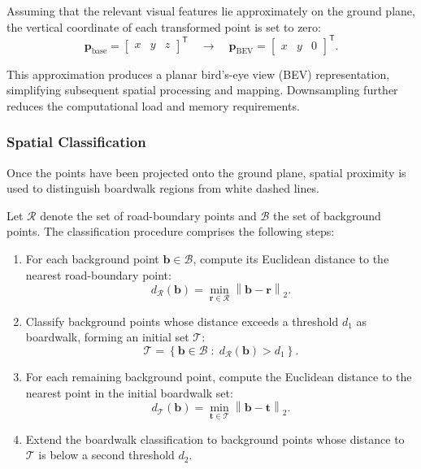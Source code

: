 \documentclass[a4paper,11pt,oneside]{book}
\begin{document}
Assuming that the relevant visual features lie approximately
on the ground plane, the vertical coordinate of each transformed
point is set to zero:
\begin{equation}
    \mathbf{p}_{\mathrm{base}}
    =
    \begin{bmatrix}
        x & y & z
    \end{bmatrix}^{\mathsf{T}}
    \quad \longrightarrow \quad
    \mathbf{p}_{\mathrm{BEV}}
    =
    \begin{bmatrix}
        x & y & 0
    \end{bmatrix}^{\mathsf{T}}.
    \label{eq:ground_plane_projection}
\end{equation}

This approximation produces a planar bird's-eye view (BEV)
representation, simplifying subsequent spatial processing
and mapping. Downsampling further reduces the computational
load and memory requirements.

\subsubsection{Spatial Classification}

Once the points have been projected onto the ground plane,
spatial proximity is used to distinguish boardwalk regions
from white dashed lines.

Let $\mathcal{R}$ denote the set of road-boundary points and
$\mathcal{B}$ the set of background points. The classification
procedure comprises the following steps:

\begin{enumerate}
    \item For each background point $\mathbf{b}\in\mathcal{B}$,
    compute its Euclidean distance to the nearest road-boundary
    point:
    \begin{equation}
        d_{\mathcal{R}}(\mathbf{b})
        =
        \min_{\mathbf{r}\in\mathcal{R}}
        \left\|\mathbf{b}-\mathbf{r}\right\|_2.
    \end{equation}

    \item Classify background points whose distance exceeds
    a threshold $d_1$ as boardwalk, forming an initial set
    $\mathcal{T}$:
    \begin{equation}
        \mathcal{T}
        =
        \left\{
        \mathbf{b}\in\mathcal{B}
        \;:\;
        d_{\mathcal{R}}(\mathbf{b})>d_1
        \right\}.
    \end{equation}

    \item For each remaining background point, compute the
    Euclidean distance to the nearest point in the initial
    boardwalk set:
    \begin{equation}
        d_{\mathcal{T}}(\mathbf{b})
        =
        \min_{\mathbf{t}\in\mathcal{T}}
        \left\|\mathbf{b}-\mathbf{t}\right\|_2.
    \end{equation}

    \item Extend the boardwalk classification to background
    points whose distance to $\mathcal{T}$ is below a second
    threshold $d_2$.
\end{enumerate}
\end{document}
